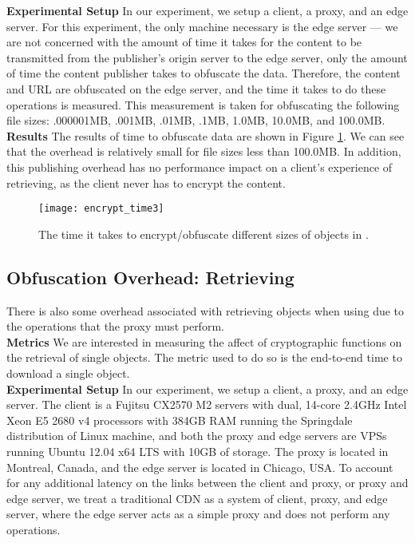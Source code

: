 {\bf Experimental Setup}
In our experiment, we setup a client, a proxy, and an edge server. For this experiment, the only machine necessary is 
the edge server --- we are not concerned with the amount of time it takes for the content to be transmitted from 
the publisher's origin server to the edge server, only the amount of time the content publisher takes to obfuscate the data.  Therefore, 
the content and URL are obfuscated on the edge server, and the time it takes to do these operations is measured.  This 
measurement is taken for obfuscating the following file sizes: .000001MB, .001MB, .01MB, .1MB, 1.0MB, 10.0MB, and 100.0MB. \\

{\bf Results}
The results of time to obfuscate data are shown in Figure \ref{fig:encrypt_time}.  We can see that the overhead 
is relatively small for file sizes less than 100.0MB.  In addition, this publishing overhead has no performance impact 
on a client's experience of retrieving, as the client never has to encrypt the content.  

\begin{figure}[t]
\centering
\texttt{[image: encrypt\_time3]}
\caption{The time it takes to encrypt/obfuscate different sizes of objects in \system{}.}
\label{fig:encrypt_time}
\end{figure}

\subsection{Obfuscation Overhead: Retrieving}
There is also some overhead associated with retrieving objects when using \system{} due to the operations that 
the proxy must perform.  \\

{\bf Metrics}
We are interested in measuring the affect of cryptographic functions on the retrieval of single 
objects.  The metric used to do so is the end-to-end time to download a single object.  \\

{\bf Experimental Setup}
In our experiment, we setup a client, a proxy, and an edge server.  The client is a  Fujitsu CX2570 M2 servers with dual, 
14-core 2.4GHz Intel Xeon E5 2680 v4 processors with 384GB RAM running the Springdale distribution of Linux machine, 
and both the proxy and edge servers are VPSs running Ubuntu 12.04 x64 LTS with 10GB of storage. The proxy is located in 
Montreal, Canada, and the edge server is located in Chicago, USA.  To account for any additional latency on the links between 
the client and proxy, or proxy and edge server, we treat a traditional CDN as a system of client, proxy, and edge server, where 
the edge server acts as a simple proxy and does not perform any operations.  

